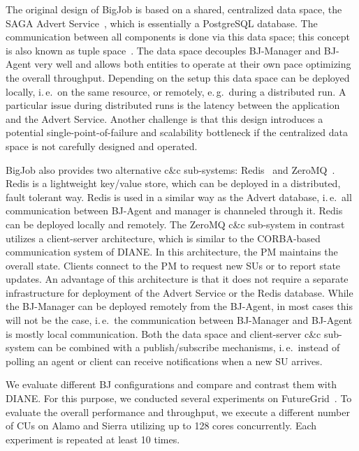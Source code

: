 \documentclass[conference,final]{IEEEtran}
\newcommand{\jhanote}[1]{ {\textcolor{red} { ***shantenu: #1 }}}
\newcommand{\alnote}[1]{ {\textcolor{blue} { ***andre: #1 }}}
\newcommand{\alnote}[1]{}
\newcommand{\jhanote}[1]{}
\newcommand{\cu}{CU}
\begin{document}
The original design of BigJob is based on a shared, centralized data
space, the SAGA Advert Service~\cite{saga_advert}, which is
essentially a PostgreSQL database. The communication between all
components is done via this data space; this concept is also known as
tuple space~\cite{Gelernter:1985:GCL:2363.2433}.  The data space
decouples BJ-Manager and BJ-Agent very well and allows both entities
to operate at their own pace optimizing the overall throughput.
Depending on the setup this data space can be deployed locally,
i.\,e.\ on the same resource, or remotely, e.\,g.\ during a
distributed run. A particular issue during distributed runs is the
latency between the application and the Advert Service. Another
challenge is that this design introduces a potential
single-point-of-failure and scalability bottleneck if the centralized
data space is not carefully designed and operated.


BigJob also provides two alternative c\&c sub-systems:
Redis~\cite{redis} and ZeroMQ~\cite{zmq}. Redis is a lightweight
key/value store, which can be deployed in a distributed, fault
tolerant way. Redis is used in a similar way as the Advert database,
i.\,e.\ all communication between BJ-Agent and manager is channeled
through it. Redis can be deployed locally and remotely.  The ZeroMQ
c\&c sub-system in contrast utilizes a client-server architecture,
which is similar to the CORBA-based~\cite{OMG-CORBA303:2004}
communication system of DIANE. In this architecture, the PM maintains
the overall state. Clients connect to the PM to request new SUs or to
report state updates. An advantage of this architecture is that it
does not require a separate infrastructure for deployment of the
Advert Service or the Redis database. While the BJ-Manager can be
deployed remotely from the BJ-Agent, in most cases this will not be
the case, i.\,e.\ the communication between BJ-Manager and BJ-Agent is
mostly local communication. Both the data space and client-server c\&c
sub-system can be combined with a publish/subscribe mechanisms,
i.\,e.\ instead of polling an agent or client can receive
notifications when a new SU arrives. 

We evaluate different BJ configurations and compare and contrast them
with DIANE. For this purpose, we conducted several experiments on
FutureGrid~\cite{fg}. To evaluate the overall performance and
throughput, we execute a different number of \cu s on Alamo and Sierra
utilizing up to 128 cores concurrently. Each experiment is repeated at
least 10 times.

\end{document}
